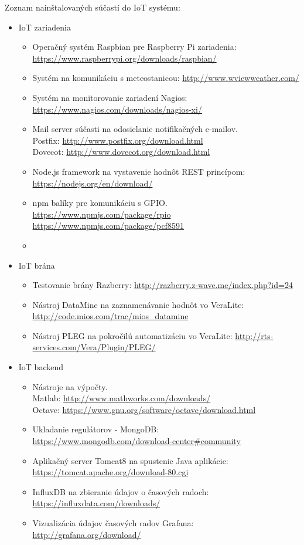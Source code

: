 Zoznam nainštalovaných súčastí do IoT systému:
\begin{itemize}
\item IoT zariadenia
  \begin{itemize}
    \item Operačný systém Raspbian pre Raspberry Pi zariadenia: \url{https://www.raspberrypi.org/downloads/raspbian/}
    \item Systém na komunikáciu s meteostanicou: \url{http://www.wviewweather.com/}    
    \item Systém na monitorovanie zariadení Nagios: \url{https://www.nagios.com/downloads/nagios-xi/}
    \item Mail server súčasti na odosielanie notifikačných e-mailov. \\
Postfix: \url{http://www.postfix.org/download.html} \\
Dovecot: \url{http://www.dovecot.org/download.html}
    \item Node.js framework na vystavenie hodnôt REST princípom: \url{https://nodejs.org/en/download/}
    \item npm balíky pre komunikáciu s GPIO. \\
\url{https://www.npmjs.com/package/rpio} \\
\url{https://www.npmjs.com/package/pcf8591}
	\item
  \end{itemize}
\item IoT brána
  \begin{itemize}
    \item Testovanie brány Razberry: \url{http://razberry.z-wave.me/index.php?id=24}
    \item Nástroj DataMine na zaznamenávanie hodnôt vo VeraLite: \url{http://code.mios.com/trac/mios_datamine} 
    \item Nástroj PLEG na pokročilú automatizáciu vo VeraLite: \url{http://rts-services.com/Vera/Plugin/PLEG/} 
  \end{itemize}   
\item IoT backend
  \begin{itemize}
    \item Nástroje na výpočty.\\
Matlab: \url{http://www.mathworks.com/downloads/} \\
Octave: \url{https://www.gnu.org/software/octave/download.html}    
    \item Ukladanie regulátorov - MongoDB: \url{https://www.mongodb.com/download-center#community}
    \item Aplikačný server Tomcat8 na spustenie Java aplikácie: \url{https://tomcat.apache.org/download-80.cgi}
    \item InfluxDB na zbieranie údajov o časových radoch: \url{https://influxdata.com/downloads/}
    \item Vizualizácia údajov časových radov Grafana: \url{http://grafana.org/download/}
  \end{itemize}
\end{itemize}